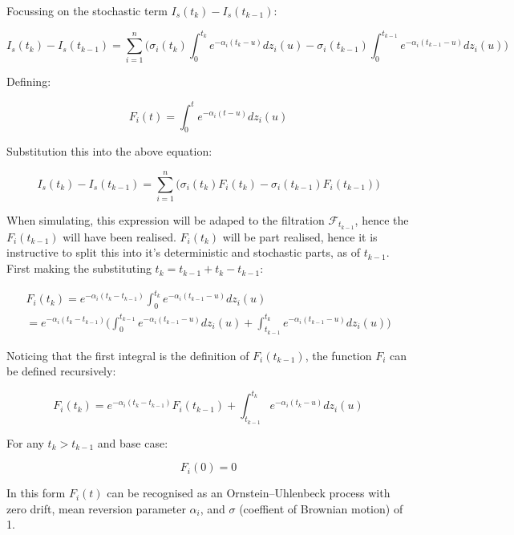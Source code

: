 \documentclass{article}
\begin{document}
Focussing on the stochastic term $I_s(t_k) - I_s(t_{k-1})$:

\begin{equation}
    I_s(t_k) - I_s(t_{k-1}) = \sum_{i=1}^n \biggl( \sigma_i(t_k) 
    \int_0^{t_k} e^{-\alpha_i(t_k-u)} dz_i(u) - \sigma_i(t_{k-1}) 
    \int_0^{t_{k-1}} e^{-\alpha_i(t_{k-1}-u)} dz_i(u) \biggr)
\end{equation}

Defining:

\begin{equation}
    F_i(t) = \int_0^{t} e^{-\alpha_i(t-u)} dz_i(u)
\end{equation}

Substitution this into the above equation:

\begin{equation}
    I_s(t_k) - I_s(t_{k-1}) = \sum_{i=1}^n \biggl( \sigma_i(t_k) 
    F_i(t_k) - \sigma_i(t_{k-1}) F_i(t_{k-1}) \biggr)
\end{equation}


When simulating, this expression will be adaped to the filtration $\mathcal{F}_{t_{k-1}}$, hence the
$F_i(t_{k-1})$ will have been realised. $F_i(t_k)$ will be part realised, hence it is instructive
to split this into it's deterministic and stochastic parts, as of $t_{k-1}$. First making the
substituting $t_k = t_{k-1} + t_k - t_{k-1}$:

\begin{eqnarray}
    \nonumber
    F_i(t_k) = e^{-\alpha_i(t_k - t_{k-1})} \int_0^{t_k} e^{-\alpha_i(t_{k-1}-u)} dz_i(u) \\
        = e^{-\alpha_i(t_k - t_{k-1})} \biggl(\int_0^{t_{k-1}} e^{-\alpha_i(t_{k-1}-u)} dz_i(u) +
        \int_{t_{k-1}}^{t_k} e^{-\alpha_i(t_{k-1}-u)} dz_i(u) \biggr)
\end{eqnarray}

Noticing that the first integral is the definition of $F_i(t_{k-1})$, the function $F_i$ can
be defined recursively:

\begin{equation}
    F_i(t_k) = e^{-\alpha_i(t_k - t_{k-1})}F_i(t_{k-1}) + \int_{t_{k-1}}^{t_k} e^{-\alpha_i(t_k-u)} dz_i(u)
\end{equation}

For any $t_k > t_{k-1}$ and base case:

\begin{equation}
    F_i(0) = 0
\end{equation}

In this form $F_i(t)$ can be recognised as an Ornstein–Uhlenbeck process with zero drift,
mean reversion parameter $\alpha_i$, and $\sigma$ (coeffient of Brownian motion) of 1.
\end{document}
